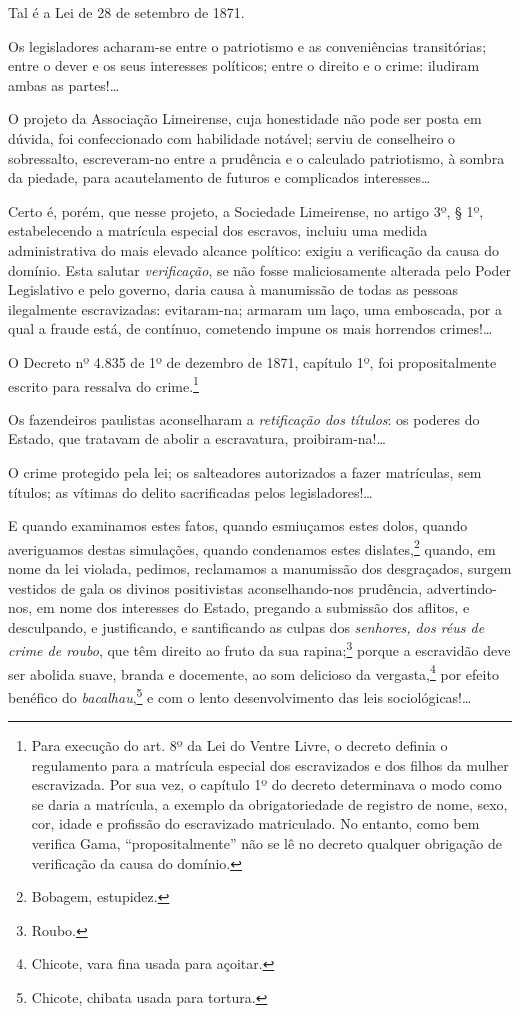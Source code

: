 {Tal é a Lei de 28 de setembro de 1871.

Os legisladores acharam-se entre o patriotismo e as conveniências
transitórias; entre o dever e os seus interesses políticos; entre o
direito e o crime: iludiram ambas as partes!\ldots{}

O projeto da Associação Limeirense, cuja honestidade não pode ser posta
em dúvida, foi confeccionado com habilidade notável; serviu de
conselheiro o sobressalto, escreveram-no entre a prudência e o calculado
patriotismo, à sombra da piedade, para acautelamento de futuros e
complicados interesses\ldots{}

Certo é, porém, que nesse projeto, a Sociedade Limeirense, no artigo 3º,
§ 1º, estabelecendo a matrícula especial dos escravos, incluiu uma
medida administrativa do mais elevado alcance político: exigiu a
verificação da causa do domínio. Esta salutar \emph{verificação}, se não
fosse maliciosamente alterada pelo Poder Legislativo e pelo governo,
daria causa à manumissão de todas as pessoas ilegalmente escravizadas:
evitaram-na; armaram um laço, uma emboscada, por a qual a fraude está,
de contínuo, cometendo impune os mais horrendos crimes!\ldots{}

O Decreto nº 4.835 de 1º de dezembro de 1871, capítulo 1º, foi
propositalmente escrito para ressalva do crime.\footnote{Para execução
  do art. 8º da Lei do Ventre Livre, o decreto definia o regulamento
  para a matrícula especial dos escravizados e dos filhos da mulher
  escravizada. Por sua vez, o capítulo 1º do decreto determinava o modo
  como se daria a matrícula, a exemplo da obrigatoriedade de registro de
  nome, sexo, cor, idade e profissão do escravizado matriculado. No
  entanto, como bem verifica Gama, ``propositalmente'' não se lê no
  decreto qualquer obrigação de verificação da causa do domínio.}

Os fazendeiros paulistas aconselharam a \emph{retificação dos títulos}:
os poderes do Estado, que tratavam de abolir a escravatura,
proibiram-na!\ldots{}

O crime protegido pela lei; os salteadores autorizados a fazer
matrículas, sem títulos; as vítimas do delito sacrificadas pelos
legisladores!\ldots{}

E quando examinamos estes fatos, quando esmiuçamos estes dolos, quando
averiguamos destas simulações, quando condenamos estes
dislates,\footnote{Bobagem, estupidez.} quando, em nome da lei
violada, pedimos, reclamamos a manumissão dos desgraçados, surgem
vestidos de gala os divinos positivistas aconselhando-nos prudência,
advertindo-nos, em nome dos interesses do Estado, pregando a submissão
dos aflitos, e desculpando, e justificando, e santificando as culpas dos
\emph{senhores, dos réus de crime de roubo}, que têm direito ao fruto da
sua rapina;\footnote{Roubo.} porque a escravidão deve ser abolida
suave, branda e docemente, ao som delicioso da vergasta,\footnote{
  Chicote, vara fina usada para açoitar.} por efeito benéfico do
\emph{bacalhau},\footnote{Chicote, chibata usada para tortura.}
e com o lento
desenvolvimento das leis sociológicas!\ldots{}

}
